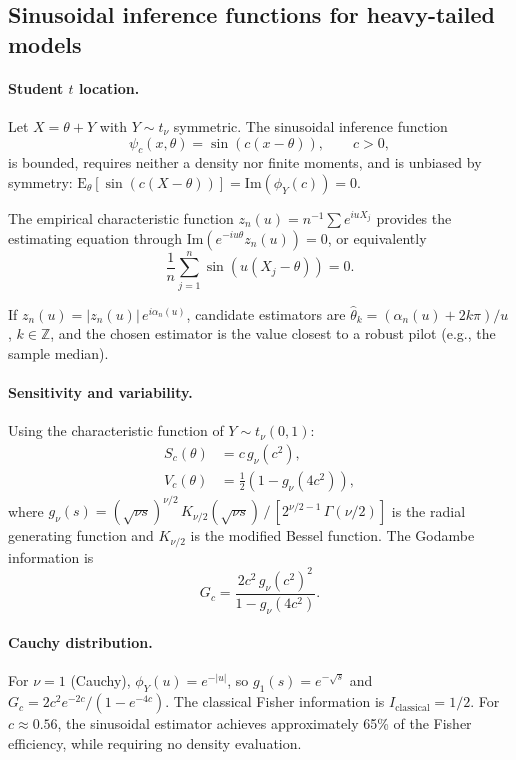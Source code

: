 \documentclass[11pt,a4paper]{article}
\newcommand{\E}{\mathrm{E}}
\begin{document}
\subsection{Sinusoidal inference functions for heavy-tailed models}\label{subsec:sinusoidal}

\paragraph{Student $t$ location.}
Let $X = \theta + Y$ with $Y \sim t_\nu$ symmetric.  The sinusoidal
inference function
\[
\psi_c(x, \theta) = \sin(c(x - \theta)), \qquad c > 0,
\]
is bounded, requires neither a density nor finite moments, and is
unbiased by symmetry:
$\E_\theta[\sin(c(X - \theta))] = \mathrm{Im}(\phi_Y(c)) = 0$.

The empirical characteristic function
$z_n(u) = n^{-1}\sum e^{iuX_j}$ provides the estimating equation through
$\mathrm{Im}(e^{-iu\theta} z_n(u)) = 0$, or equivalently
\[
\frac{1}{n} \sum_{j=1}^n \sin(u(X_j - \theta)) = 0.
\]

If $z_n(u) = |z_n(u)|\,e^{i\alpha_n(u)}$, candidate estimators are
$\hat\theta_k = (\alpha_n(u) + 2k\pi)/u$, $k \in \mathbb Z$, and the
chosen estimator is the value closest to a robust pilot (e.g., the sample
median).

\paragraph{Sensitivity and variability.}
Using the characteristic function of $Y \sim t_\nu(0,1)$:
\begin{align*}
S_c(\theta) &= c\,g_\nu(c^2), \\
V_c(\theta) &= \tfrac{1}{2}(1 - g_\nu(4c^2)),
\end{align*}
where $g_\nu(s) = (\sqrt{\nu s})^{\nu/2}\,K_{\nu/2}(\sqrt{\nu s})\,
/\,[2^{\nu/2-1}\,\Gamma(\nu/2)]$ is the radial generating function and
$K_{\nu/2}$ is the modified Bessel function.  The Godambe information is
\[
G_c = \frac{2c^2\,g_\nu(c^2)^2}{1 - g_\nu(4c^2)}.
\]

\paragraph{Cauchy distribution.}
For $\nu = 1$ (Cauchy), $\phi_Y(u) = e^{-|u|}$, so $g_1(s) = e^{-\sqrt{s}}$
and
$G_c = 2c^2 e^{-2c}/(1 - e^{-4c})$.
The classical Fisher information is $I_{\mathrm{classical}} = 1/2$.  For
$c \approx 0.56$, the sinusoidal estimator achieves approximately 65\% of
the Fisher efficiency, while requiring no density evaluation.
\end{document}
